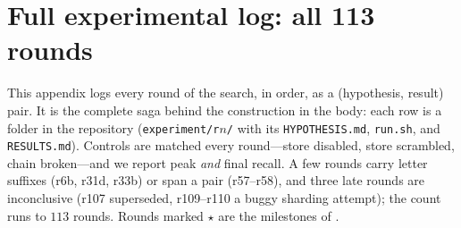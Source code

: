 \section{Full experimental log: all 113 rounds}
\label{app:log}

This appendix logs every round of the search, in order, as a
(hypothesis, result) pair. It is the complete saga behind the construction in the
body: each row is a folder in the repository (\texttt{experiment/r$n$/} with its
\texttt{HYPOTHESIS.md}, \texttt{run.sh}, and \texttt{RESULTS.md}). Controls are matched
every round---store disabled, store scrambled, chain broken---and we report peak
\emph{and} final recall. A few rounds carry letter suffixes (r6b, r31d, r33b) or span a
pair (r57--r58), and three late rounds are inconclusive (r107 superseded, r109--r110 a buggy
sharding attempt); the count runs to $113$ rounds. Rounds marked $\star$ are the
milestones of .

